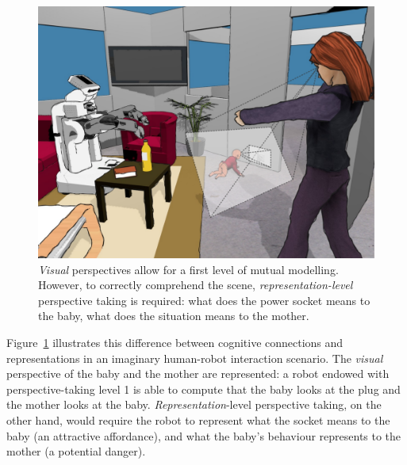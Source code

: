 \documentclass{sig-alternate}
\begin{document}
\begin{figure}
        \centering
        \includegraphics[width=0.9\columnwidth]{representation-perspective-taking}
        \caption{\small \emph{Visual} perspectives allow for a first level of mutual
            modelling. However, to correctly comprehend the scene,
            \emph{representation-level} perspective taking is required: what
            does the power socket means to the baby, what does the situation
            means to the mother.}

        \label{representation-level}
\end{figure}

Figure~\ref{representation-level} illustrates this difference between cognitive
connections and representations in an imaginary human-robot interaction
scenario. The \emph{visual} perspective of the baby and the mother are
represented: a robot endowed with perspective-taking level 1 is able to compute
that the baby looks at the plug and the mother looks at the baby.
\emph{Representation}-level perspective taking, on the other hand, would require
the robot to represent what the socket means to the baby (an attractive
affordance), and what the baby's behaviour represents to the mother (a potential
danger).
\end{document}
